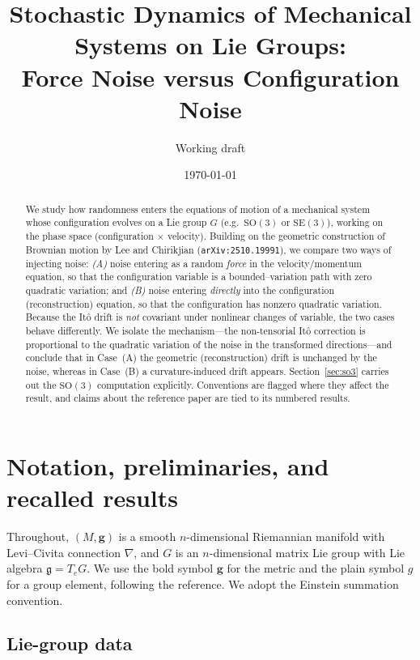 \documentclass[11pt]{article}
\title{\bf Stochastic Dynamics of Mechanical Systems on Lie Groups:\\
Force Noise versus Configuration Noise}
\author{Working draft}
\date{\today}
\theoremstyle{plain}
\theoremstyle{definition}
\newcommand{\g}{\mathfrak{g}}
\newcommand{\SO}{\mathrm{SO}(3)}
\newcommand{\SE}{\mathrm{SE}(3)}
\begin{document}
\maketitle

\begin{abstract}
We study how randomness enters the equations of motion of a mechanical
system whose configuration evolves on a Lie group $G$ (e.g.\ $\SO$ or $\SE$),
working on the phase space (configuration $\times$ velocity). Building on the
geometric construction of Brownian motion by Lee and Chirikjian
(\texttt{arXiv:2510.19991}), we compare two ways of injecting noise:
\emph{(A)} noise entering as a random \emph{force} in the velocity/momentum
equation, so that the configuration variable is a bounded--variation path with
zero quadratic variation; and \emph{(B)} noise entering \emph{directly} into the
configuration (reconstruction) equation, so that the configuration has nonzero
quadratic variation. Because the It\^o drift is \emph{not} covariant under
nonlinear changes of variable, the two cases behave differently. We isolate the
mechanism---the non-tensorial It\^o correction is proportional to the quadratic
variation of the noise in the transformed directions---and conclude that in
Case~(A) the geometric (reconstruction) drift is unchanged by the noise, whereas
in Case~(B) a curvature-induced drift appears. Section~\ref{sec:so3} carries out
the $\SO$ computation explicitly. Conventions are flagged where they affect the
result, and claims about the reference paper are tied to its numbered results.
\end{abstract}

\tableofcontents

\section{Notation, preliminaries, and recalled results}
\label{sec:prelim}

Throughout, $(M,\mathbf{g})$ is a smooth $n$-dimensional Riemannian manifold with
Levi--Civita connection $\nabla$, and $G$ is an $n$-dimensional matrix Lie group
with Lie algebra $\g=T_eG$. We use the bold symbol $\mathbf{g}$ for the metric
and the plain symbol $g$ for a group element, following the reference. We adopt
the Einstein summation convention.

\subsection{Lie-group data}
\end{document}
